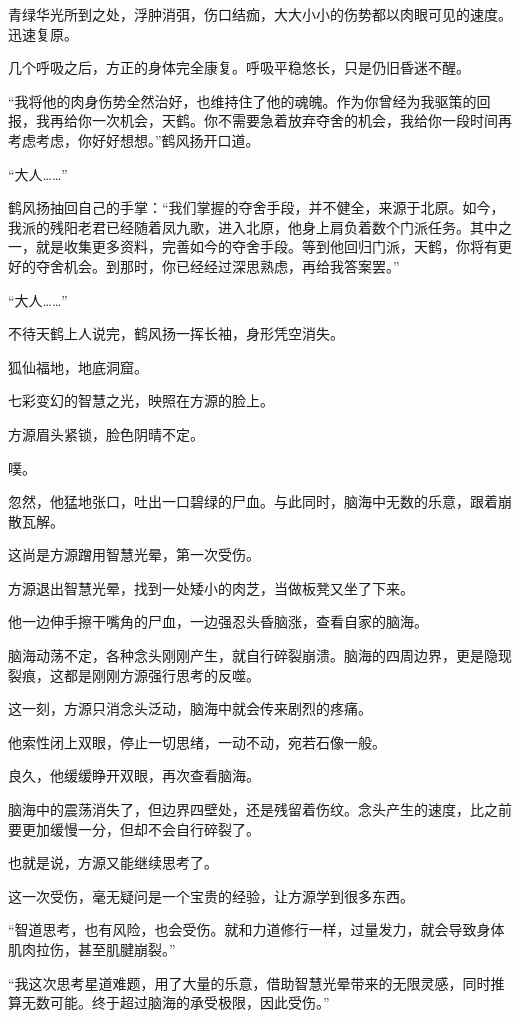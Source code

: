 \begin{this_body}
青绿华光所到之处，浮肿消弭，伤口结痂，大大小小的伤势都以肉眼可见的速度。迅速复原。

几个呼吸之后，方正的身体完全康复。呼吸平稳悠长，只是仍旧昏迷不醒。

“我将他的肉身伤势全然治好，也维持住了他的魂魄。作为你曾经为我驱策的回报，我再给你一次机会，天鹤。你不需要急着放弃夺舍的机会，我给你一段时间再考虑考虑，你好好想想。”鹤风扬开口道。

“大人……”

鹤风扬抽回自己的手掌：“我们掌握的夺舍手段，并不健全，来源于北原。如今，我派的残阳老君已经随着凤九歌，进入北原，他身上肩负着数个门派任务。其中之一，就是收集更多资料，完善如今的夺舍手段。等到他回归门派，天鹤，你将有更好的夺舍机会。到那时，你已经经过深思熟虑，再给我答案罢。”

“大人……”

不待天鹤上人说完，鹤风扬一挥长袖，身形凭空消失。

狐仙福地，地底洞窟。

七彩变幻的智慧之光，映照在方源的脸上。

方源眉头紧锁，脸色阴晴不定。

噗。

忽然，他猛地张口，吐出一口碧绿的尸血。与此同时，脑海中无数的乐意，跟着崩散瓦解。

这尚是方源蹭用智慧光晕，第一次受伤。

方源退出智慧光晕，找到一处矮小的肉芝，当做板凳又坐了下来。

他一边伸手擦干嘴角的尸血，一边强忍头昏脑涨，查看自家的脑海。

脑海动荡不定，各种念头刚刚产生，就自行碎裂崩溃。脑海的四周边界，更是隐现裂痕，这都是刚刚方源强行思考的反噬。

这一刻，方源只消念头泛动，脑海中就会传来剧烈的疼痛。

他索性闭上双眼，停止一切思绪，一动不动，宛若石像一般。

良久，他缓缓睁开双眼，再次查看脑海。

脑海中的震荡消失了，但边界四壁处，还是残留着伤纹。念头产生的速度，比之前要更加缓慢一分，但却不会自行碎裂了。

也就是说，方源又能继续思考了。

这一次受伤，毫无疑问是一个宝贵的经验，让方源学到很多东西。

“智道思考，也有风险，也会受伤。就和力道修行一样，过量发力，就会导致身体肌肉拉伤，甚至肌腱崩裂。”

“我这次思考星道难题，用了大量的乐意，借助智慧光晕带来的无限灵感，同时推算无数可能。终于超过脑海的承受极限，因此受伤。”


\end{this_body}
